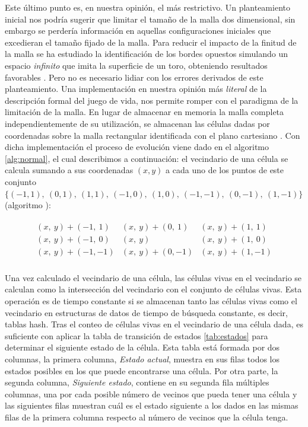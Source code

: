 \documentclass[../proyecto.tex]{memoir}
\begin{document}
Este último punto es, en nuestra opinión, el más restrictivo. Un planteamiento inicial nos podría sugerir que limitar el tamaño de la malla dos dimensional, sin embargo se perdería información en aquellas configuraciones iniciales que excedieran el tamaño fijado de la malla. Para reducir el impacto de la finitud de la malla se ha estudiado la identificación de los bordes opuestos simulando un espacio \textit{infinito} que imita la superficie de un toro, obteniendo resultados favorables \cite{finitudMalla, finitudMalla2}. Pero no es necesario lidiar con los errores derivados de este planteamiento. Una implementación en nuestra opinión más \textit{literal} de la descripción formal del juego de vida, nos permite romper con el paradigma de la limitación de la malla. En lugar de almacenar en memoria la malla completa independientemente de su utilización, se almacenan las células dadas por coordenadas sobre la malla rectangular identificada con el plano cartesiano \cite{boardless}. Con dicha implementación el proceso de evolución viene dado en el algoritmo \ref{alg:normal}, el cual describimos a continuación: el vecindario de una célula se calcula sumando a sus coordenadas $(x,y)$ a cada uno de los puntos de este conjunto $\{(-1, 1),\ (0, 1),\ (1, 1),\ (-1, 0),\ (1, 0),\ (-1,-1),\ (0,-1),\ (1,-1)\}$ (algoritmo ):

\begin{align*}
\begin{array}{lcr}
(x,\ y)+(-1,\ 1) & (x,\ y)+(0,\ 1) & (x,\ y)+(1,\ 1)\\
(x,\ y)+(-1,\ 0) & (x,\ y) & (x,\ y)+(1,\ 0)\\
(x,\ y)+(-1,-1) & (x,\ y)+(0,-1) & (x,\ y)+(1,-1)\\
\end{array} 
\end{align*}

Una vez calculado el vecindario de una célula, las células vivas en el vecindario se calculan como la intersección del vecindario con el conjunto de células vivas. Esta operación es de tiempo constante si se almacenan tanto las células vivas como el vecindario en estructuras de datos de tiempo de búsqueda constante, es decir, tablas hash. Tras el conteo de células vivas en el vecindario de una célula dada, es suficiente con aplicar la tabla de transición de estados \ref{tab:estados} para determinar el siguiente estado de la célula. Esta tabla está formada por dos columnas, la primera columna, \textit{Estado actual}, muestra en sus filas todos los estados posibles en los que puede encontrarse una célula. Por otra parte, la segunda columna, \textit{Siguiente estado}, contiene en su segunda fila múltiples columnas, una por cada posible número de vecinos que pueda tener una célula y las siguientes filas muestran cuál es el estado siguiente a los dados en las mismas filas de la primera columna respecto al número de vecinos que la célula tenga. 
\end{document}
